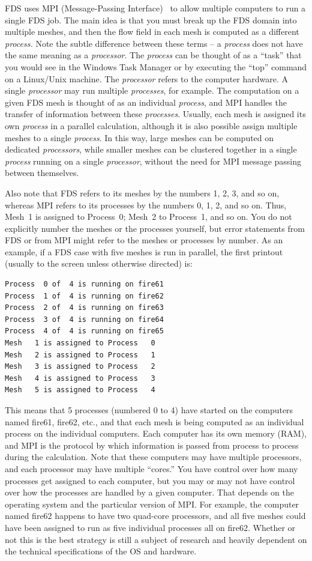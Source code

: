 \documentclass[11pt]{book}
\begin{document}
FDS uses MPI (Message-Passing Interface)~\cite{Gropp:1} to allow
multiple computers to run a single FDS job. The main idea is that you must break up the FDS domain into multiple meshes, and then
the flow field in each mesh is computed as a different {\em process.}
Note the subtle difference between these
terms -- a {\em process} does not have the same meaning as a {\em processor}.
The {\em process} can be thought of as a ``task'' that you would see in
the Windows Task Manager or by executing the ``top'' command on a Linux/Unix machine. The {\em processor} refers to the
computer hardware. A single
{\em processor} may run multiple {\em processes}, for example.
The computation on a given FDS mesh is thought of as an individual {\em process}, and
MPI handles the transfer of information between these {\em processes}.
Usually, each mesh is assigned its own {\em process} in a parallel calculation,
although it is also possible
assign multiple meshes to a single {\em process}.
In this way, large meshes can be computed on dedicated {\em processors}, while
smaller meshes can be clustered together in a single {\em process} running on a single {\em processor},
without the need for MPI message passing between themselves.

Also note that FDS refers to its meshes by the numbers 1, 2, 3, and so on, whereas MPI refers to its processes by the numbers
0, 1, 2, and so on. Thus, Mesh~1 is assigned to Process~0; Mesh~2 to Process~1, and so on.
You do not explicitly number the meshes or the processes yourself, but
error statements from FDS or from MPI might refer to the meshes or processes by number.
As an example, if a FDS case with five meshes is run in parallel, the first printout (usually to the screen unless
otherwise directed) is:
\begin{lstlisting}
Process  0 of  4 is running on fire61
Process  1 of  4 is running on fire62
Process  2 of  4 is running on fire63
Process  3 of  4 is running on fire64
Process  4 of  4 is running on fire65
Mesh   1 is assigned to Process   0
Mesh   2 is assigned to Process   1
Mesh   3 is assigned to Process   2
Mesh   4 is assigned to Process   3
Mesh   5 is assigned to Process   4
\end{lstlisting}
This means that 5 processes (numbered 0 to 4) have started on the computers named fire61, fire62, etc., and that each mesh is being computed as an individual process on the
individual computers. Each computer has its own memory (RAM), and MPI is the protocol by which information is passed from process to process during the calculation. Note that these
computers may have multiple processors, and each processor may have multiple ``cores.'' You have control over how many processes get assigned to each computer, but you may or may not
have control over how the processes are handled by a given computer. That depends on the operating system and the particular version of MPI. For example, the computer named fire62 happens to have
two quad-core processors, and all five meshes could have been assigned to run as five individual processes all on fire62. Whether or not this is the best strategy is still a subject of
research and heavily dependent on the technical specifications of the OS and hardware.
\end{document}

